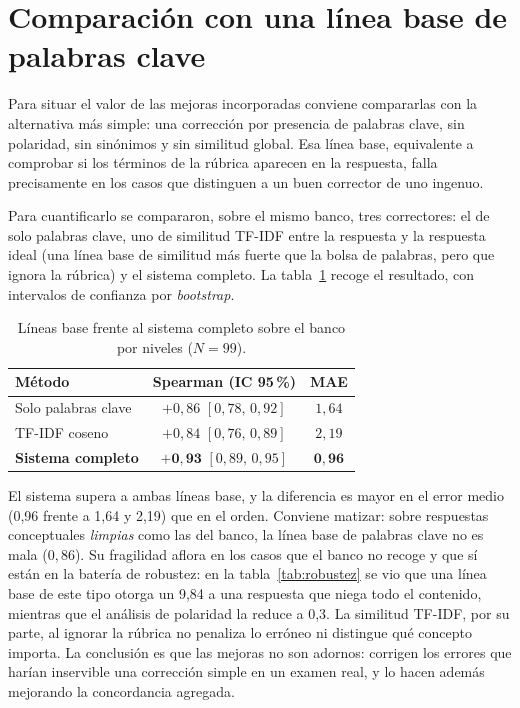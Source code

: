 \section{Comparación con una línea base de palabras clave}

Para situar el valor de las mejoras incorporadas conviene compararlas con la alternativa más simple: una corrección por presencia de palabras clave, sin polaridad, sin sinónimos y sin similitud global. Esa línea base, equivalente a comprobar si los términos de la rúbrica aparecen en la respuesta, falla precisamente en los casos que distinguen a un buen corrector de uno ingenuo.

Para cuantificarlo se compararon, sobre el mismo banco, tres correctores: el de solo palabras clave, uno de similitud TF-IDF entre la respuesta y la respuesta ideal (una línea base de similitud más fuerte que la bolsa de palabras, pero que ignora la rúbrica) y el sistema completo. La tabla~\ref{tab:baselines} recoge el resultado, con intervalos de confianza por \emph{bootstrap}.

\begin{table}[ht]
\centering
\caption{Líneas base frente al sistema completo sobre el banco por niveles ($N=99$).}
\label{tab:baselines}
\small
\begin{tabular}{lcc}
\toprule
Método & Spearman (IC 95\,\%) & MAE \\
\midrule
Solo palabras clave & $+0{,}86$ $[0{,}78,\,0{,}92]$ & $1{,}64$ \\
TF-IDF coseno & $+0{,}84$ $[0{,}76,\,0{,}89]$ & $2{,}19$ \\
\textbf{Sistema completo} & $\mathbf{+0{,}93}$ $[0{,}89,\,0{,}95]$ & $\mathbf{0{,}96}$ \\
\bottomrule
\end{tabular}
\end{table}

El sistema supera a ambas líneas base, y la diferencia es mayor en el error medio (0,96 frente a 1,64 y 2,19) que en el orden. Conviene matizar: sobre respuestas conceptuales \emph{limpias} como las del banco, la línea base de palabras clave no es mala ($0{,}86$). Su fragilidad aflora en los casos que el banco no recoge y que sí están en la batería de robustez: en la tabla~\ref{tab:robustez} se vio que una línea base de este tipo otorga un 9{,}84 a una respuesta que niega todo el contenido, mientras que el análisis de polaridad la reduce a 0{,}3. La similitud TF-IDF, por su parte, al ignorar la rúbrica no penaliza lo erróneo ni distingue qué concepto importa. La conclusión es que las mejoras no son adornos: corrigen los errores que harían inservible una corrección simple en un examen real, y lo hacen además mejorando la concordancia agregada.

